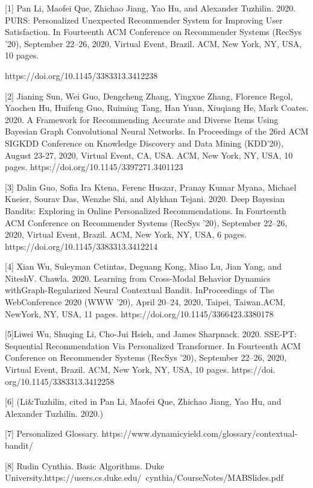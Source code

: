 \documentclass[english,twoside,censored,tkt,sw-line]{HYthesisML}
\begin{document}
[1] Pan Li, Maofei Que, Zhichao Jiang, Yao Hu, and Alexander Tuzhilin. 2020. PURS: Personalized Unexpected Recommender System for Improving User Satisfaction. In Fourteenth ACM Conference on Recommender Systems (RecSys ’20), September 22–26, 2020, Virtual Event, Brazil. ACM, New York, NY, USA, 10 pages.
\begin{sloppypar}
https://doi.org/10.1145/3383313.3412238
\end{sloppypar}

[2] Jianing Sun, Wei Guo, Dengcheng Zhang, Yingxue Zhang, Florence Regol, Yaochen Hu, Huifeng Guo, Ruiming Tang, Han Yuan, Xiuqiang He, Mark Coates. 2020. A Framework for Recommending Accurate and Diverse Items Using Bayesian Graph Convolutional Neural Networks. In Proceedings of the 26rd ACM SIGKDD Conference on Knowledge Discovery and Data Mining (KDD’20), August 23-27, 2020, Virtual Event, CA, USA. ACM, New York, NY, USA, 10 pages. https://doi.org/10.1145/3397271.3401123

[3] Dalin Guo, Sofia Ira Ktena, Ferenc Huszar, Pranay Kumar Myana, Michael Kneier, Sourav Das, Wenzhe Shi, and Alykhan Tejani. 2020. Deep Bayesian Bandits: Exploring in Online Personalized Recommendations. In Fourteenth ACM Conference on Recommender Systems (RecSys ’20), September 22–26, 2020, Virtual Event, Brazil. ACM, New York, NY, USA, 6 pages. https://doi.org/10.1145/3383313.3412214

[4] Xian Wu, Suleyman Cetintas, Deguang Kong, Miao Lu, Jian Yang, and NiteshV. Chawla. 2020. Learning from Cross-Modal Behavior Dynamics withGraph-Regularized Neural Contextual Bandit. InProceedings of The WebConference 2020 (WWW ’20), April 20–24, 2020, Taipei, Taiwan.ACM, NewYork, NY, USA, 11 pages.
\newline
https://doi.org/10.1145/3366423.3380178

[5]Liwei Wu, Shuqing Li, Cho-Jui Hsieh, and James Sharpnack. 2020. SSE-PT:
Sequential Recommendation Via Personalized Transformer. In Fourteenth
ACM Conference on Recommender Systems (RecSys ’20), September 22–26,
2020, Virtual Event, Brazil. ACM, New York, NY, USA, 10 pages. https://doi.
org/10.1145/3383313.3412258

[6] (Li\&Tuzhilin, cited in Pan Li, Maofei Que, Zhichao Jiang, Yao Hu, and Alexander Tuzhilin. 2020.) 

[7] Personalized Glossary. https://www.dynamicyield.com/glossary/contextual-bandit/

[8] Rudin Cynthia. Basic Algorithms. Duke   
University.https://users.cs.duke.edu/~cynthia/CourseNotes/MABSlides.pdf
\end{document}
